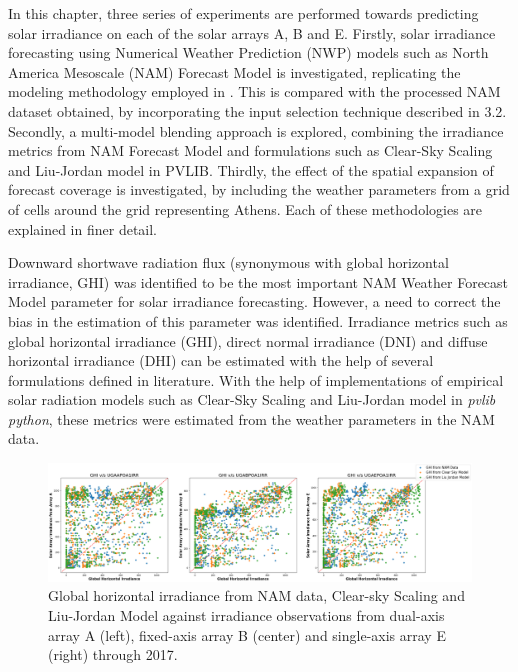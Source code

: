 \par In this chapter, three series of experiments are performed towards predicting solar irradiance on each of the solar arrays A, B and E. Firstly, solar irradiance forecasting using Numerical Weather Prediction (NWP) models such as North America Mesoscale (NAM) Forecast Model is investigated, replicating the modeling methodology employed in \cite{thesis_zach}. This is compared with the processed NAM dataset obtained, by incorporating the input selection technique described in 3.2. Secondly, a multi-model blending approach is explored, combining the irradiance metrics from NAM Forecast Model and formulations such as Clear-Sky Scaling and Liu-Jordan model in PVLIB. Thirdly, the effect of the spatial expansion of forecast coverage is investigated, by including the weather parameters from a grid of cells around the grid representing Athens. Each of these methodologies are explained in finer detail.

\par Downward shortwave radiation flux (synonymous with global horizontal irradiance, GHI) was identified to be the most important NAM Weather Forecast Model parameter for solar irradiance forecasting. However, a need to correct the bias in the estimation of this parameter was identified. Irradiance metrics such as global horizontal irradiance (GHI), direct normal irradiance (DNI) and diffuse horizontal irradiance (DHI) can be estimated with the help of several formulations defined in literature. With the help of implementations of empirical solar radiation models such as Clear-Sky Scaling and Liu-Jordan model in \textit{pvlib python}, these metrics were estimated from the weather parameters in the NAM data.

\begin{figure}[ht]
    \begin{center}
    	\includegraphics[width=\textwidth]{chapter4/fig_ghi_irradiance.png}
    	\caption[Global horizontal irradiance from NAM data, Clear-sky Scaling and Liu-Jordan against irradiance observations from arrays A, B and E through 2017.]{Global horizontal irradiance from NAM data, Clear-sky Scaling and Liu-Jordan Model against irradiance observations from dual-axis array A (left), fixed-axis array B (center) and single-axis array E (right) through 2017.}
    	\label{fig:fig_ghi_irradiance}
    \end{center}
\end{figure}

